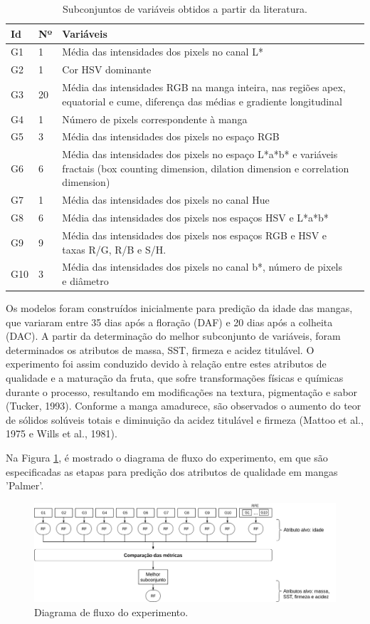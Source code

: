 \begin{longtable}{l l L{9cm} m{3cm}}
    \caption{Subconjuntos de variáveis obtidos a partir da literatura.}\label{tbl:var}
    \hline
    Id & Nº & Variáveis \\ \hline
    G1 & 1 & Média das intensidades dos pixels no canal L*  \\ \hline
    G2 & 1 & Cor HSV dominante \\ \hline
    G3 & 20 & Média das intensidades RGB na manga inteira, nas regiões apex, equatorial e cume, diferença das médias e gradiente longitudinal \\ \hline
    G4 & 1 & Número de pixels correspondente à manga  \\ \hline
    G5 & 3 & Média das intensidades dos pixels no espaço RGB \\ \hline
    G6 & 6 & Média das intensidades dos pixels no espaço L*a*b* e variáveis fractais (box counting dimension, dilation dimension e correlation dimension)   \\ \hline
    G7 & 1 & Média das intensidades dos pixels no canal Hue \\ \hline
    G8 & 6 & Média das intensidades dos pixels nos espaços HSV e L*a*b* \\ \hline
    G9 & 9 & Média das intensidades dos pixels nos espaços RGB e HSV e taxas R/G, R/B e S/H. \\ \hline
    G10 & 3 & Média das intensidades dos pixels no canal b*, número de pixels e diâmetro \\ \hline
\end{longtable}

Os modelos foram construídos inicialmente para predição da idade das mangas, que variaram entre 35 dias após a floração (DAF) e 20 dias após a colheita (DAC). A partir da determinação do melhor subconjunto de variáveis, foram determinados os atributos de massa, SST, firmeza e acidez titulável. O experimento foi assim conduzido devido à relação entre estes atributos de qualidade e a maturação da fruta, que sofre transformações físicas e químicas durante o processo, resultando em modificações na textura, pigmentação e sabor (Tucker, 1993). Conforme a manga amadurece, são observados o aumento do teor de sólidos solúveis totais e diminuição da acidez titulável e firmeza (Mattoo et al., 1975 e Wills et al., 1981).

Na Figura \ref{fig:abordagem}, é mostrado o diagrama de fluxo do experimento, em que são especificadas as etapas para predição dos atributos de qualidade em mangas 'Palmer'.

\begin{figure}[H]
\centering
    \includegraphics[scale=0.5]{imgs/abordagem_proposta.png}
    \caption{Diagrama de fluxo do experimento.}\label{fig:abordagem}
\end{figure}